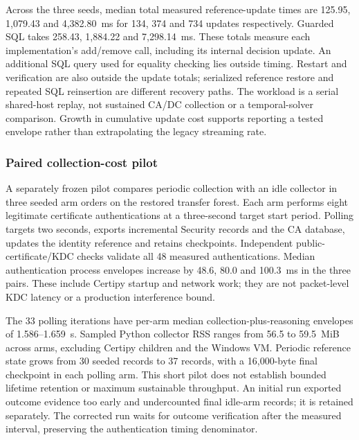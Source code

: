 Across the three seeds, median total measured reference-update times are 125.95, 1,079.43 and 4,382.80~ms for 134, 374 and 734 updates respectively. Guarded SQL takes 258.43, 1,884.22 and 7,298.14~ms. These totals measure each implementation's add/remove call, including its internal decision update. An additional SQL query used for equality checking lies outside timing. Restart and verification are also outside the update totals; serialized reference restore and repeated SQL reinsertion are different recovery paths. The workload is a serial shared-host replay, not sustained CA/DC collection or a temporal-solver comparison. Growth in cumulative update cost supports reporting a tested envelope rather than extrapolating the legacy streaming rate.

\subsubsection{Paired collection-cost pilot}
A separately frozen pilot compares periodic collection with an idle collector in three seeded arm orders on the restored transfer forest. Each arm performs eight legitimate certificate authentications at a three-second target start period. Polling targets two seconds, exports incremental Security records and the CA database, updates the identity reference and retains checkpoints. Independent public-certificate/KDC checks validate all 48 measured authentications. Median authentication process envelopes increase by 48.6, 80.0 and 100.3~ms in the three pairs. These include Certipy startup and network work; they are not packet-level KDC latency or a production interference bound.

The 33 polling iterations have per-arm median collection-plus-reasoning envelopes of 1.586--1.659~s. Sampled Python collector RSS ranges from 56.5 to 59.5~MiB across arms, excluding Certipy children and the Windows VM. Periodic reference state grows from 30 seeded records to 37 records, with a 16,000-byte final checkpoint in each polling arm. This short pilot does not establish bounded lifetime retention or maximum sustainable throughput. An initial run exported outcome evidence too early and undercounted final idle-arm records; it is retained separately. The corrected run waits for outcome verification after the measured interval, preserving the authentication timing denominator.

